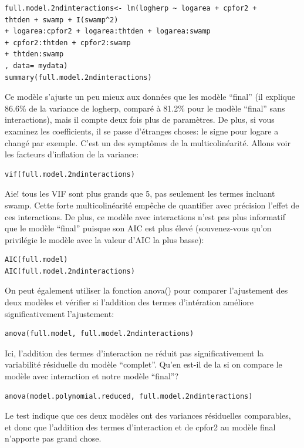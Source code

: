 \documentclass[12pt,]{book}
\begin{document}
\begin{verbatim}
full.model.2ndinteractions<- lm(logherp ~ logarea + cpfor2 +
thtden + swamp + I(swamp^2)
+ logarea:cpfor2 + logarea:thtden + logarea:swamp
+ cpfor2:thtden + cpfor2:swamp
+ thtden:swamp
, data= mydata)
summary(full.model.2ndinteractions)
\end{verbatim}

Ce modèle s'ajuste un peu mieux aux données que les modèle ``final'' (il explique 86.6\% de la variance de logherp, comparé à 81.2\% pour le modèle ``final'' sans interactions), mais il compte deux fois plus de paramètres. De plus, si vous examinez les coefficients, il se passe d'étranges choses: le signe pour logare a changé par exemple. C'est un des symptômes de la multicolinéarité. Allons voir les facteurs d'inflation de la variance:

\begin{verbatim}
vif(full.model.2ndinteractions)
\end{verbatim}

Aie! tous les VIF sont plus grands que 5, pas seulement les termes incluant swamp. Cette forte multicolinéarité empêche de quantifier avec précision l'effet de ces interactions. De plus, ce modèle avec interactions n'est pas plus informatif que le modèle ``final'' puisque son AIC est plus élevé (souvenez-vous qu'on privilégie le modèle avec la valeur d'AIC la plus basse):

\begin{verbatim}
AIC(full.model)
AIC(full.model.2ndinteractions)
\end{verbatim}

On peut également utiliser la fonction anova() pour comparer l'ajustement des deux modèles et vérifier si l'addition des termes d'intération améliore significativement l'ajustement:

\begin{verbatim}
anova(full.model, full.model.2ndinteractions)
\end{verbatim}

Ici, l'addition des termes d'interaction ne réduit pas significativement la variabilité résiduelle du modèle ``complet''. Qu'en est-il de la si on compare le modèle avec interaction et notre modèle ``final''?

\begin{verbatim}
anova(model.polynomial.reduced, full.model.2ndinteractions)
\end{verbatim}

Le test indique que ces deux modèles ont des variances résiduelles comparables, et donc que l'addition des termes d'interaction et de cpfor2 au modèle final n'apporte pas grand chose.
\end{document}
